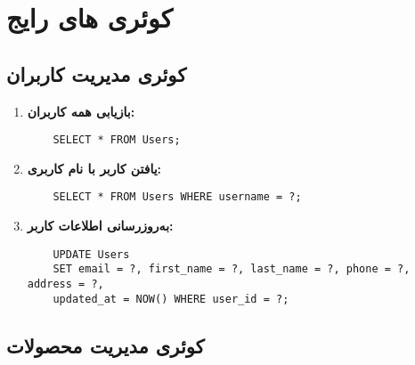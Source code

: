\documentclass[12pt]{article}
\begin{document}
\section{کوئری های رایج}

\subsection{کوئری مدیریت کاربران}

\begin{enumerate}
    \item \textbf{بازیابی همه کاربران:}
    \begin{latin}
    \begin{verbatim}
    SELECT * FROM Users;
    \end{verbatim}
    \end{latin}
    
    \item \textbf{یافتن کاربر با نام کاربری:}
    \begin{latin}
    \begin{verbatim}
    SELECT * FROM Users WHERE username = ?;
    \end{verbatim}
    \end{latin}
    
    \item \textbf{به‌روزرسانی اطلاعات کاربر:}
    \begin{latin}
    \begin{verbatim}
    UPDATE Users
    SET email = ?, first_name = ?, last_name = ?, phone = ?, address = ?,
    updated_at = NOW() WHERE user_id = ?;
    \end{verbatim}
    \end{latin}
\end{enumerate}

\subsection{کوئری مدیریت محصولات}
\end{document}
